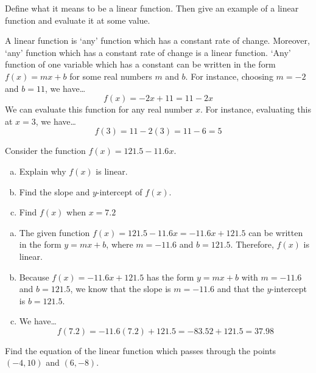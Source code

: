 \documentclass[11pt,letterpaper]{article}
\begin{document}

 Define what it means to be a linear function. Then give an example of a linear function and evaluate it at some value. \pspace

\sol A linear function is `any' function which has a constant rate of change. Moreover, `any' function which has a constant rate of change is a linear function. `Any' function of one variable which has a constant can be written in the form $f(x)= mx + b$ for some real numbers $m$ and $b$. For instance, choosing $m= -2$ and $b= 11$, we have\dots
	\[
	f(x)= -2x + 11= 11 - 2x
	\]
We can evaluate this function for any real number $x$. For instance, evaluating this at $x= 3$, we have\dots
	\[
	f(3)= 11 - 2(3)= 11 - 6= 5
	\]



\newpage



 Consider the function $f(x)= 121.5 - 11.6x$. 
	\begin{enumerate}[(a)]
	\item Explain why $f(x)$ is linear.
	\item Find the slope and $y$-intercept of $f(x)$.
	\item Find $f(x)$ when $x= 7.2$
	\end{enumerate} \pspace

\begin{enumerate}[(a)]
\item The given function $f(x)= 121.5 - 11.6x= -11.6x + 121.5$ can be written in the form $y= mx + b$, where $m= -11.6$ and $b= 121.5$. Therefore, $f(x)$ is linear. \pspace

\item Because $f(x)= -11.6x + 121.5$ has the form $y= mx + b$ with $m= -11.6$ and $b= 121.5$, we know that the slope is $m= -11.6$ and that the $y$-intercept is $b= 121.5$. \pspace

\item We have\dots
	\[
	f(7.2)= -11.6(7.2) + 121.5= -83.52 + 121.5= 37.98
	\]
\end{enumerate}



\newpage



 Find the equation of the linear function which passes through the points $(-4, 10)$ and $(6, -8)$. \pspace
\end{document}
